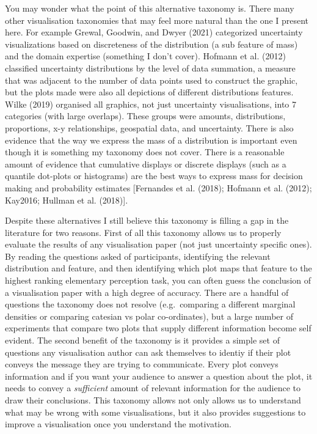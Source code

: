 \documentclass[
  letterpaper,
  DIV=11,
  numbers=noendperiod]{scrartcl}
\begin{document}
You may wonder what the point of this alternative taxonomy is. There
many other visualisation taxonomies that may feel more natural than the
one I present here. For example Grewal, Goodwin, and Dwyer (2021)
categorized uncertainty visualizations based on discreteness of the
distribution (a sub feature of mass) and the domain expertise (something
I don't cover). Hofmann et al. (2012) classified uncertainty
distributions by the level of data summation, a measure that was
adjacent to the number of data points used to construct the graphic, but
the plots made were also all depictions of different distributions
features. Wilke (2019) organised all graphics, not just uncertainty
visualisations, into 7 categories (with large overlaps). These groups
were amounts, distributions, proportions, x-y relationships, geospatial
data, and uncertainty. There is also evidence that the way we express
the mass of a distribution is important even though it is something my
taxonomy does not cover. There is a reasonable amount of evidence that
cumulative displays or discrete displays (such as a quantile dot-plots
or histograms) are the best ways to express mass for decision making and
probability estimates {[}Fernandes et al. (2018); Hofmann et al. (2012);
Kay2016; Hullman et al. (2018){]}.

Despite these alternatives I still believe this taxonomy is filling a
gap in the literature for two reasons. First of all this taxonomy allows
us to properly evaluate the results of any visualisation paper (not just
uncertainty specific ones). By reading the questions asked of
participants, identifying the relevant distribution and feature, and
then identifying which plot maps that feature to the highest ranking
elementary perception task, you can often guess the conclusion of a
visualisation paper with a high degree of accuracy. There are a handful
of questions the taxonomy does not resolve (e.g.~comparing a different
marginal densities or comparing catesian vs polar co-ordinates), but a
large number of experiments that compare two plots that supply different
information become self evident. The second benefit of the taxonomy is
it provides a simple set of questions any visualisation author can ask
themselves to identiy if their plot conveys the message they are trying
to communicate. Every plot conveys information and if you want your
audience to answer a question about the plot, it needs to convey a
\emph{sufficient} amount of relevant information for the audience to
draw their conclusions. This taxonomy allows not only allows us to
understand what may be wrong with some visualisations, but it also
provides suggestions to improve a visualisation once you understand the
motivation.
\end{document}
